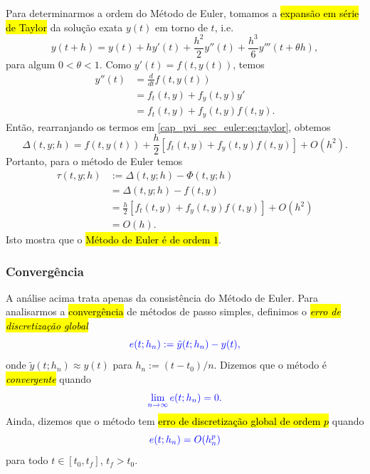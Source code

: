 Para determinarmos a ordem do Método de Euler, tomamos a \hl{expansão em série de Taylor}{\taylor} da solução exata $y(t)$ em torno de $t$, i.e.
\begin{equation}\label{cap_pvi_sec_euler:eq:taylor}
  y(t+h) = y(t) + hy'(t) + \frac{h^2}{2}y''(t) + \frac{h^3}{6}y'''(t+\theta h),
\end{equation}
para algum $0<\theta<1$.
Como $y'(t)=f(t, y(t))$, temos
\begin{align}
  y''(t) &= \frac{d}{dt}f(t, y(t)) \\
         &= f_t(t, y) + f_y(t, y)y'\\
         &= f_t(t, y) + f_y(t, y)f(t, y).
\end{align}
Então, rearranjando os termos em \eqref{cap_pvi_sec_euler:eq:taylor}, obtemos
\begin{equation}\label{eq:pvi_delta_aux}
  \Delta(t, y; h) = f(t, y(t)) + \frac{h}{2}[f_t(t, y) + f_y(t, y)f(t, y)] + O(h^2).
\end{equation}
Portanto, para o método de Euler temos
\begin{align}
  \tau(t, y; h) &:= \Delta(t, y; h)-\Phi(t, y; h)\\
              &= \Delta(t, y; h) - f(t, y)\\
              &= \frac{h}{2}[f_t(t, y) + f_y(t, y)f(t, y)] + O(h^2)\\
              &= O(h).
\end{align}
Isto mostra que o \hl{Método de Euler é de ordem $1$}.

\subsubsection{Convergência}

A análise acima trata apenas da consistência do Método de Euler. Para analisarmos a \hl{convergência} de métodos de passo simples, definimos o \hl{\emph{erro de discretização global}}
\begin{equation}\color{blue}e(t; h_n) := \tilde{y}(t; h_n) - y(t),
\end{equation}
onde $\tilde{y}(t; h_n) \approx y(t)$ para $h_n := (t-t_0)/n$. Dizemos que o método é \hl{\emph{convergente}} quando
\begin{equation}\color{blue}\lim_{n\to \infty} e(t; h_n) = 0.
\end{equation}
Ainda, dizemos que o método tem \hl{erro de discretização global de ordem $p$} quando
\begin{equation}\color{blue}e(t; h_n) = O(h_n^p)
\end{equation}
para todo $t\in [t_0, t_f]$, $t_f > t_0$.


